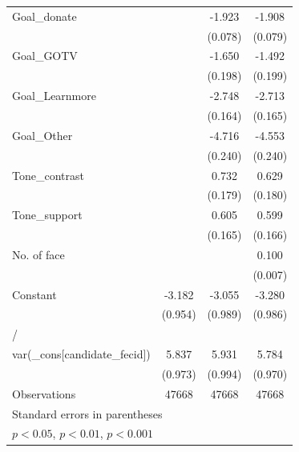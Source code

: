 \begin{tabular}{l*{3}{c}}
Goal\_donate              &                     &      -1.923\sym{***}&      -1.908\sym{***}\\
                    &                     &     (0.078)         &     (0.079)         \\
Goal\_GOTV                &                     &      -1.650\sym{***}&      -1.492\sym{***}\\
                    &                     &     (0.198)         &     (0.199)         \\
Goal\_Learnmore           &                     &      -2.748\sym{***}&      -2.713\sym{***}\\
                    &                     &     (0.164)         &     (0.165)         \\
Goal\_Other               &                     &      -4.716\sym{***}&      -4.553\sym{***}\\
                    &                     &     (0.240)         &     (0.240)         \\
Tone\_contrast            &                     &       0.732\sym{***}&       0.629\sym{***}\\
                    &                     &     (0.179)         &     (0.180)         \\
Tone\_support             &                     &       0.605\sym{***}&       0.599\sym{***}\\
                    &                     &     (0.165)         &     (0.166)         \\
No. of face          &                     &                     &       0.100\sym{***}\\
                    &                     &                     &     (0.007)         \\
Constant            &      -3.182\sym{***}&      -3.055\sym{**} &      -3.280\sym{***}\\
                    &     (0.954)         &     (0.989)         &     (0.986)         \\
\midrule
/                   &                     &                     &                     \\
var(\_cons[candidate\_fecid])&       5.837\sym{***}&       5.931\sym{***}&       5.784\sym{***}\\
                    &     (0.973)         &     (0.994)         &     (0.970)         \\
\midrule
Observations        &       47668         &       47668         &       47668         \\
\bottomrule
\multicolumn{4}{l}{\footnotesize Standard errors in parentheses}\\
\multicolumn{4}{l}{\footnotesize \sym{*} \(p<0.05\), \sym{**} \(p<0.01\), \sym{***} \(p<0.001\)}\\
\end{tabular}
